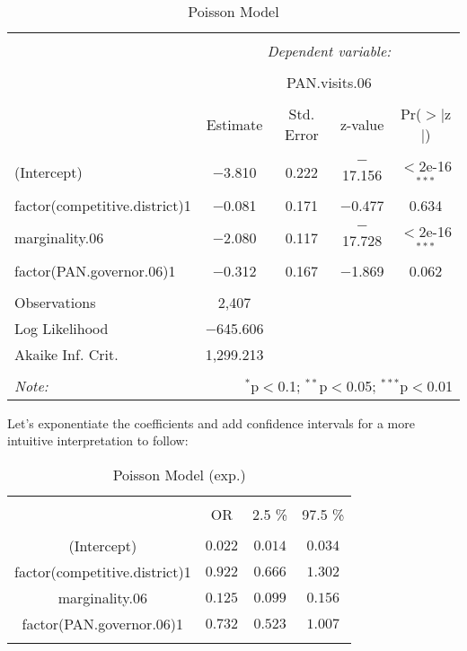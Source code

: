 \documentclass[12pt,letterpaper]{article}
\begin{document}
\begin{enumerate}
\begin{table}[!htbp] \centering 
  \caption{Poisson Model} 
  \label{} 
\begin{tabular}{@{\extracolsep{5pt}}lcccc} 
\\[-1.8ex]\hline 
\hline \\[-1.8ex] 
 & \multicolumn{4}{c}{\textit{Dependent variable:}} \\ 
\cline{2-5} 
\\[-1.8ex] & \multicolumn{4}{c}{PAN.visits.06} \\ 
\\[-1.8ex] & Estimate & Std. Error & z-value & Pr($>$$|$z$|$) \\ 
\hline \\[-1.8ex] 
 (Intercept) & $-$3.810 & 0.222 & $-$17.156 & $<$2e-16$^{***}$ \\ 
  factor(competitive.district)1 & $-$0.081 & 0.171 & $-$0.477 & 0.634 \\ 
  marginality.06 & $-$2.080 & 0.117 & $-$17.728 & $<$2e-16$^{***}$ \\ 
  factor(PAN.governor.06)1 & $-$0.312 & 0.167 & $-$1.869 & 0.062 \\ 
\hline \\[-1.8ex] 
Observations & 2,407 & & & \\ 
Log Likelihood & $-$645.606 & & & \\ 
Akaike Inf. Crit. & 1,299.213 & & & \\ 
\hline 
\hline \\[-1.8ex] 
\textit{Note:}  & \multicolumn{4}{r}{$^{*}$p$<$0.1; $^{**}$p$<$0.05; $^{***}$p$<$0.01} \\ 
\end{tabular} 
\end{table}
	
		Let's exponentiate the coefficients and add confidence intervals for a more intuitive interpretation to follow: 
	
	 

\begin{table}[H] \centering   \caption{Poisson Model (exp.)}   \label{} \begin{tabular}{@{\extracolsep{5pt}} cccc} \\[-1.8ex]\hline \hline \\[-1.8ex]  & OR & 2.5 \% & 97.5 \% \\ \hline \\[-1.8ex] (Intercept) & $0.022$ & $0.014$ & $0.034$ \\ factor(competitive.district)1 & $0.922$ & $0.666$ & $1.302$ \\ marginality.06 & $0.125$ & $0.099$ & $0.156$ \\ factor(PAN.governor.06)1 & $0.732$ & $0.523$ & $1.007$ \\ \hline \\[-1.8ex] \end{tabular} \end{table} 


\end{enumerate}
\end{document}
